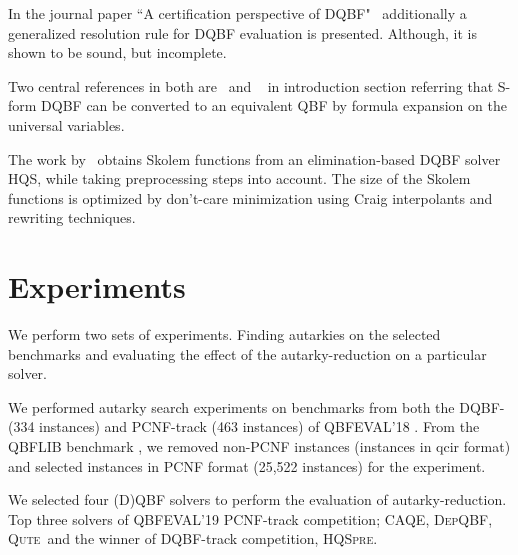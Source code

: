 \documentclass[runningheads]{llncs}
\newcommand{\caqe}{\textsc{CAQE}}
\newcommand{\depqbf}{\textsc{DepQBF}}
\newcommand{\qute}{\textsc{Qute}}
\newcommand{\hqspre}{\textsc{HQSpre}}
\begin{document}
In the journal paper ``A certification perspective of DQBF"~\cite{balabanov2014henkin} additionally a generalized resolution rule for DQBF evaluation is presented. Although,  it is shown to be sound, but incomplete.

Two central references in both are~\cite{bubeck2006dependency} and ~\cite{bubeck2010model} in introduction section referring that S-form DQBF can be converted to an equivalent QBF by formula expansion on the universal variables.


The work by~\cite{wimmer2016skolem} obtains Skolem functions from an elimination-based DQBF solver HQS, while taking preprocessing steps into account.
%
The size of the Skolem functions is optimized by don’t-care minimization using Craig interpolants and rewriting techniques.


\section{Experiments}\label{sec:experiments}
We perform two sets of experiments. Finding autarkies on the selected benchmarks and evaluating the effect of the autarky-reduction on a particular solver.

We performed autarky search experiments on benchmarks from both the DQBF- (334 instances) and  PCNF-track (463 instances) of QBFEVAL'18 \cite{Qbfeval18}.
%
From the QBFLIB benchmark \cite{Qbflib}, we removed non-PCNF instances (instances in qcir format) and selected instances in PCNF format (25,522 instances) for the experiment.



We selected four (D)QBF solvers to perform the evaluation of autarky-reduction. Top three solvers of QBFEVAL'19 PCNF-track competition; \caqe \cite{DBLP:conf/fmcad/RabeT15}, \depqbf \cite{DBLP:conf/cade/LonsingE17}, \qute \cite{DBLP:journals/jsat/PeitlSS19}\ and the winner of DQBF-track competition, \hqspre \cite{DBLP:conf/tacas/WimmerRM017}.
\end{document}
